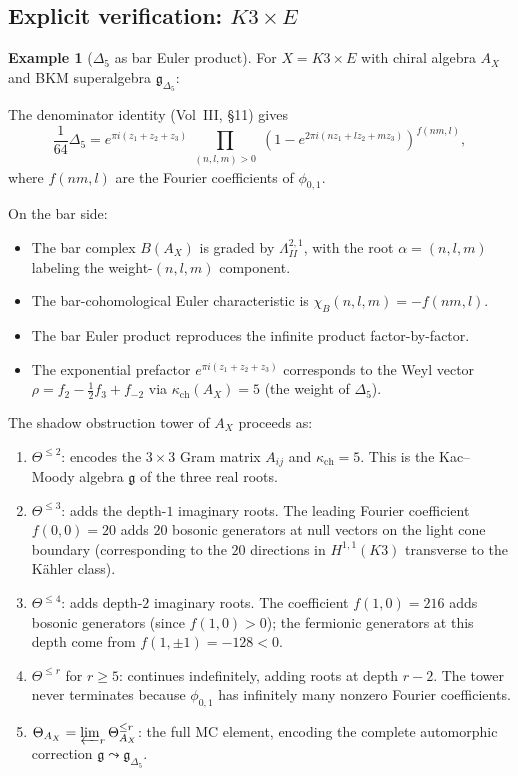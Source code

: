 \documentclass[11pt]{amsart}
\theoremstyle{definition}
\newtheorem{example}[theorem]{Example}
\theoremstyle{remark}
\newcommand{\fg}{\mathfrak{g}}
\begin{document}
\subsection{Explicit verification: $K3 \times E$}

\begin{example}[$\Delta_5$ as bar Euler product]
\label{ex:delta5-bar}
For $X = K3 \times E$ with chiral algebra $A_X$ and BKM
superalgebra $\fg_{\Delta_5}$:

The denominator identity (Vol~III, \S11) gives
\[
 \frac{1}{64}\Delta_5
 = e^{\pi i(z_1+z_2+z_3)}
 \prod_{\substack{(n,l,m)>0}}
 (1-e^{2\pi i(nz_1+lz_2+mz_3)})^{f(nm,l)},
\]
where $f(nm,l)$ are the Fourier coefficients of $\phi_{0,1}$.

On the bar side:
\begin{itemize}
 \item The bar complex $B(A_X)$ is graded by
 $\Lambda^{2,1}_{II}$, with the root $\alpha = (n,l,m)$
 labeling the weight-$(n,l,m)$ component.
 \item The bar-cohomological Euler characteristic is
 $\chi_B(n,l,m) = -f(nm,l)$.
 \item The bar Euler product reproduces the infinite product
 factor-by-factor.
 \item The exponential prefactor
 $e^{\pi i(z_1+z_2+z_3)}$ corresponds to the Weyl vector
 $\rho = f_2 - \tfrac{1}{2}f_3 + f_{-2}$ via
 $\kappa_{\mathrm{ch}}(A_X) = 5$ (the weight of $\Delta_5$).
\end{itemize}

The shadow obstruction tower of $A_X$ proceeds as:
\begin{enumerate}
 \item $\Theta^{\leq 2}$: encodes the $3 \times 3$ Gram
 matrix $A_{ij}$ and $\kappa_{\mathrm{ch}} = 5$. This is the Kac--Moody
 algebra $\fg$ of the three real roots.
 \item $\Theta^{\leq 3}$: adds the depth-$1$ imaginary roots.
 The leading Fourier coefficient $f(0,0) = 20$ adds $20$
 bosonic generators at null vectors on the light cone
 boundary (corresponding to the $20$ directions in
 $H^{1,1}(K3)$ transverse to the K\"ahler class).
 \item $\Theta^{\leq 4}$: adds depth-$2$ imaginary roots.
 The coefficient $f(1,0) = 216$ adds bosonic generators
 (since $f(1,0) > 0$); the fermionic generators at this
 depth come from $f(1,\pm 1) = -128 < 0$.
 \item $\Theta^{\leq r}$ for $r \geq 5$: continues
 indefinitely, adding roots at depth $r - 2$. The tower
 never terminates because $\phi_{0,1}$ has infinitely many
 nonzero Fourier coefficients.
 \item $\Theta_{A_X} = \varprojlim_r \Theta^{\leq r}_{A_X}$:
 the full MC element, encoding the complete automorphic
 correction $\fg \leadsto \fg_{\Delta_5}$.
\end{enumerate}
\end{example}
\end{document}
